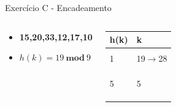 \documentclass{beamer}
\begin{document}
\begin{frame}{Exercício C - Encadeamento}
\begin{columns}
        \footnotesize         
        \begin{block}{}
 		 \begin{itemize}
 		  \item \textbf{15,20,33,12,17,10}
 		  \item $h(k) = 19 \ \mathbf{mod} \ 9$  
 		 \end{itemize}

 		  \end{block} 
    
        \begin{table}[]
        \centering
        \footnotesize
        \begin{tabular}{|l|l|}
        \hline
        h(k) & k \\ \hline
            &   \\ \hline
        1   & 19$\rightarrow$28  \\ \hline
            &   \\ \hline
            &   \\ \hline
            &   \\ \hline
        5   & 5   \\ \hline
            &   \\ \hline
            &   \\ \hline
            &   \\ \hline
        \end{tabular}%

        \end{table}       
        \end{columns}
\end{frame}
\end{document}
